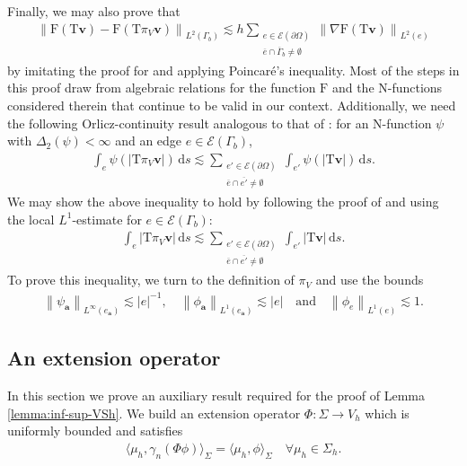 \documentclass[onefignum,onetabnum]{siamart190516}
\newcommand{\ba}{\boldsymbol{a}}
\newcommand{\bv}{\boldsymbol{v}}
\newcommand{\bT}{\boldsymbol{\mathrm{T}}}
\newcommand{\bF}{\boldsymbol{\mathrm{F}}}
\newcommand{\dd}{\mathrm{d}}
\newcommand{\nrm}[1]{\left\lVert#1\right\rVert}
\newcommand{\Ec}{\mathcal{E}}
\begin{document}
Finally, we may also prove that 
%
\begin{align}\label{eq:F-tang-approx}
	\nrm{\bF(\bT\bv) - \bF(\bT\pi_V\bv)}_{L^2(\Gamma_b)} \lesssim h \sum_{\substack{e\in\Ec(\partial\Omega)\\ \overline{e}\cap\overline{\Gamma}_b\neq\emptyset}} \nrm{\nabla\bF(\bT\bv)}_{L^2(e)}
\end{align}
%
by imitating the proof for \cite[Theorem 3.4]{belenki2012} and applying Poincar\'e's inequality. Most of the steps in this proof draw from algebraic relations for the function $\bF$ and the N-functions considered therein that continue to be valid in our context. Additionally, we need the following Orlicz-continuity result analogous to that of \cite[Theorem 3.2]{belenki2012}: for an N-function $\psi$ with $\Delta_2(\psi) < \infty$ and an edge $e\in\Ec(\Gamma_b)$, 
%
\begin{align*}
	\int_e \psi(|\bT\pi_V\bv|)\,\dd s \lesssim \sum_{\substack{e'\in\Ec(\partial\Omega)\\ \overline{e}\cap\overline{e'}\neq\emptyset}} \int_{e'} \psi(|\bT\bv|)\,\dd s.
\end{align*}
%
We may show the above inequality to hold by following the proof of \cite[Theorem 4.5]{diening2007} and using the local $L^1$-estimate for $e\in\Ec(\Gamma_b)$:
%
\begin{align*}
	\int_e |\bT\pi_V\bv|\,\dd s \lesssim \sum_{\substack{e'\in\Ec(\partial\Omega)\\ \overline{e}\cap\overline{e'}\neq\emptyset}} \int_{e'} |\bT\bv|\,\dd s.
\end{align*}
%
To prove this inequality, we turn to the definition of $\pi_V$ and use the bounds 
%
\begin{align*}
	\nrm{\psi_{\ba}}_{L^\infty(e_{\ba})}\lesssim |e|^{-1}, \quad \nrm{\phi_{\ba}}_{L^1(e_{\ba})}\lesssim |e| \quad \text{and} \quad \nrm{\phi_{e}}_{L^1(e)}\lesssim 1.
\end{align*}

\subsection{An extension operator}\label{app-subsec:extension}

In this section we prove an auxiliary result required for the proof of Lemma \ref{lemma:inf-sup-VSh}. We build an extension operator $\Phi:\Sigma\to V_h$ which is uniformly bounded and satisfies
%
\begin{align}\label{eq:appC2-property}
	\langle \mu_h, \gamma_n(\Phi\phi) \rangle_\Sigma = \langle \mu_h, \phi \rangle_\Sigma \quad \forall \mu_h \in \Sigma_h.
\end{align}
\end{document}

